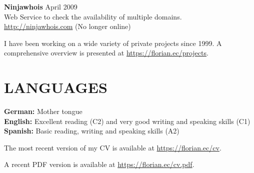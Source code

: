 \documentclass[margin]{res}
\begin{document}
\begin{resume}
\textbf{Ninjawhois} \hfill April 2009 \\
  Web Service to check the availability of multiple domains. \\ \url{http://ninjawhois.com} (No longer online)

I have been working on a wide variety of private projects since 1999. A comprehensive overview is presented at \url{https://florian.ec/projects}.


\section{LANGUAGES}

\textbf{German:} Mother tongue \\
\textbf{English:} Excellent reading (C2) and very good writing and speaking skills (C1) \\
\textbf{Spanish:} Basic reading, writing and speaking skills (A2)


\end{resume}

\vspace{15 mm}

The most recent version of my CV is available at \url{https://florian.ec/cv}.

A recent PDF version is available at \url{https://florian.ec/cv.pdf}.
\end{document}

